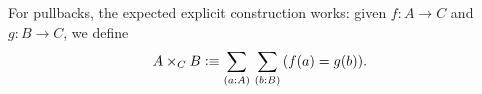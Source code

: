 \documentclass[hott-all.tex]{subfiles}
\begin{document}
%
%
For pullbacks, the expected explicit construction works: given $f:A\to C$ and $g:B\to C$, we define
\begin{equation}
  A\times_C B \defeq \sm{a:A}{b:B} (f(a)=g(b)).\label{eq:defn-pullback}
\end{equation}
%
\end{document}
